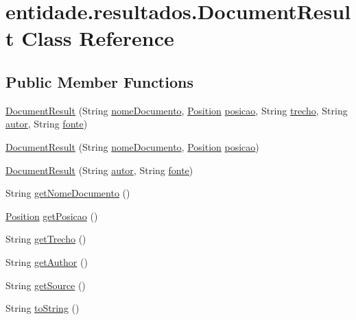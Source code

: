 \hypertarget{classentidade_1_1resultados_1_1DocumentResult}{}\section{entidade.\+resultados.\+Document\+Result Class Reference}
\label{classentidade_1_1resultados_1_1DocumentResult}
\subsection*{Public Member Functions}
\begin{DoxyCompactItemize}
\item 
\hyperlink{classentidade_1_1resultados_1_1DocumentResult_acadb0a005ce6c47313c1dbde300ecdb0}{Document\+Result} (String \hyperlink{classentidade_1_1resultados_1_1DocumentResult_ad7a0e1860d8f76fc15d65dab6cec9ac7}{nome\+Documento}, \hyperlink{classentidade_1_1Position}{Position} \hyperlink{classentidade_1_1resultados_1_1DocumentResult_af0690de1fbdf3817b5a534754656f156}{posicao}, String \hyperlink{classentidade_1_1resultados_1_1DocumentResult_ad6290fdc6352643297775c26d098003b}{trecho}, String \hyperlink{classentidade_1_1resultados_1_1DocumentResult_a3b075228042908bf76793f2bf7f8bdf3}{autor}, String \hyperlink{classentidade_1_1resultados_1_1DocumentResult_ad7180ea32ea41099262d5ca323fa7aa4}{fonte})
\item 
\hyperlink{classentidade_1_1resultados_1_1DocumentResult_a035ccff5ed35ef1cce97ea9107d6f78e}{Document\+Result} (String \hyperlink{classentidade_1_1resultados_1_1DocumentResult_ad7a0e1860d8f76fc15d65dab6cec9ac7}{nome\+Documento}, \hyperlink{classentidade_1_1Position}{Position} \hyperlink{classentidade_1_1resultados_1_1DocumentResult_af0690de1fbdf3817b5a534754656f156}{posicao})
\item 
\hyperlink{classentidade_1_1resultados_1_1DocumentResult_ad45c2937e41ef220c2008e631ffd9469}{Document\+Result} (String \hyperlink{classentidade_1_1resultados_1_1DocumentResult_a3b075228042908bf76793f2bf7f8bdf3}{autor}, String \hyperlink{classentidade_1_1resultados_1_1DocumentResult_ad7180ea32ea41099262d5ca323fa7aa4}{fonte})
\item 
String \hyperlink{classentidade_1_1resultados_1_1DocumentResult_aab081f0479196c7d4ecd31780cf3e4a5}{get\+Nome\+Documento} ()
\item 
\hyperlink{classentidade_1_1Position}{Position} \hyperlink{classentidade_1_1resultados_1_1DocumentResult_a0ed7bb9d4c27fad1bc0f9c1858f90699}{get\+Posicao} ()
\item 
String \hyperlink{classentidade_1_1resultados_1_1DocumentResult_a365863d1ef9df91c89700c01107e4c11}{get\+Trecho} ()
\item 
String \hyperlink{classentidade_1_1resultados_1_1DocumentResult_a9021856f6324fe1f6c6cdaaec6d00ece}{get\+Author} ()
\item 
String \hyperlink{classentidade_1_1resultados_1_1DocumentResult_a61e790adc2fe5d757ceae4ef067aedc4}{get\+Source} ()
\item 
String \hyperlink{classentidade_1_1resultados_1_1DocumentResult_a8cd843267b63c52a03ed3326833df1a0}{to\+String} ()
\end{DoxyCompactItemize}
